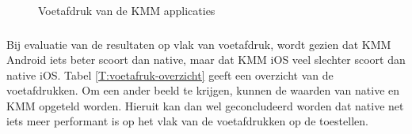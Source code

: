 \begin{figure}
    \qquad
    \caption{Voetafdruk van de KMM applicaties}
    \label{fig:M-voetafdruk-kmm}
\end{figure}

\subsubsection{}
\label{sec:M-test-voetafdruk-conclusie}
Bij evaluatie van de resultaten op vlak van voetafdruk, wordt gezien dat KMM Android iets beter scoort dan native, maar dat KMM iOS veel slechter scoort dan native iOS. Tabel \ref{T:voetafruk-overzicht} geeft een overzicht van de voetafdrukken. Om een ander beeld te krijgen, kunnen de waarden van native en KMM opgeteld worden. Hieruit kan dan wel geconcludeerd worden dat native net iets meer performant is op het vlak van de voetafdrukken op de toestellen.


